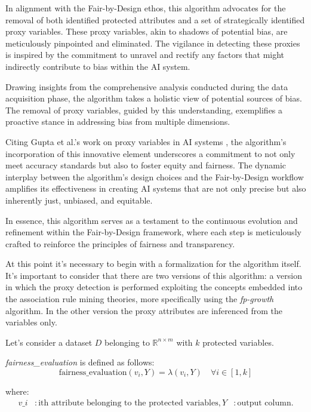\documentclass[12pt,a4paper,openright,twoside]{book}
\begin{document}
In alignment with the Fair-by-Design ethos, this algorithm advocates for the removal of both identified protected attributes and a set of strategically identified proxy variables. These proxy variables, akin to shadows of potential bias, are meticulously pinpointed and eliminated. The vigilance in detecting these proxies is inspired by the commitment to unravel and rectify any factors that might indirectly contribute to bias within the AI system.

Drawing insights from the comprehensive analysis conducted during the data acquisition phase, the algorithm takes a holistic view of potential sources of bias. The removal of proxy variables, guided by this understanding, exemplifies a proactive stance in addressing bias from multiple dimensions.

Citing Gupta et al.'s work on proxy variables in AI systems \cite{Gupta2018ProxyF}, the algorithm's incorporation of this innovative element underscores a commitment to not only meet accuracy standards but also to foster equity and fairness. The dynamic interplay between the algorithm's design choices and the Fair-by-Design workflow amplifies its effectiveness in creating AI systems that are not only precise but also inherently just, unbiased, and equitable.

In essence, this algorithm serves as a testament to the continuous evolution and refinement within the Fair-by-Design framework, where each step is meticulously crafted to reinforce the principles of fairness and transparency.

At this point it's necessary to begin with a formalization for the algorithm itself. It's important to consider that there are two versions of this algorithm: a version in which the proxy detection is performed exploiting the concepts embedded into the association rule mining theories, more specifically using the \emph{fp-growth} algorithm. In the other version the proxy attributes are inferenced from the variables only.

Let's consider a dataset \( D \) belonging to \( \mathbb{R}^{n \times m} \) with \( k \) protected variables.

\textit{fairness\_evaluation} is defined as follows:
\[
\text{fairness\_evaluation}(v_i, Y) = \lambda(v_i, Y) \quad \forall i \in [1, k]
\]

where:
\begin{align*}
v\_i & : \text{ith attribute belonging to the protected variables}, Y & : \text{output column}.
\end{align*}
\end{document}
